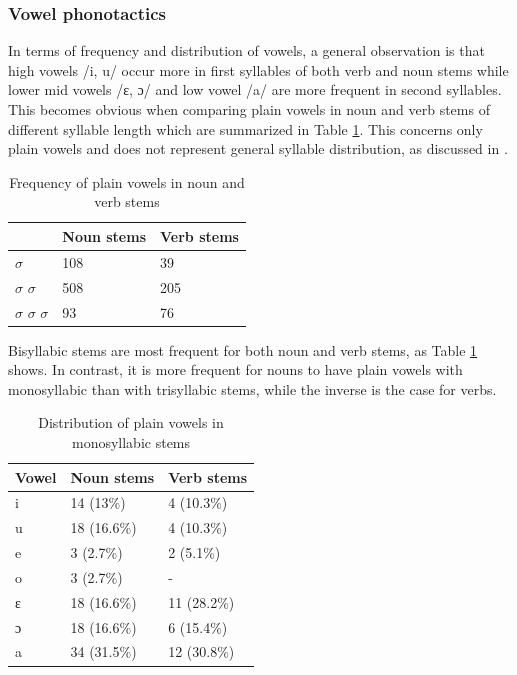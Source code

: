 \subsubsection{Vowel phonotactics} 

In terms of frequency and distribution of vowels, a general observation is that high vowels /i, u/ occur more in first syllables of both verb and noun stems while lower mid vowels /ɛ, ɔ/ and low vowel /a/ are more frequent in second syllables. This becomes obvious when comparing plain vowels in noun and verb stems of different syllable length which are summarized in Table \ref{Tab:CardV}. This concerns only plain vowels and does not represent general syllable distribution, as discussed in .


\begin{table} 
\centering
\begin{tabular}{l|ll}
& Noun stems &   Verb stems \\  \midrule
$\sigma$    & 108  &    39 \\
$\sigma$ $\sigma$  & 508 & 205 \\
$\sigma$ $\sigma$ $\sigma$ & 93 &  76 \\  \midrule
\end{tabular}
\caption{Frequency of plain vowels in noun and verb stems}
\label{Tab:CardV}
\end{table}

\noindent  Bisyllabic stems are most frequent for both noun and verb stems, as Table \ref{Tab:CardV} shows. In contrast, it is more frequent for nouns to have plain vowels with monosyllabic than with trisyllabic stems, while the inverse is the case for verbs.

\begin{table} 
\centering
\begin{tabular}{l|ll}
Vowel & Noun stems & Verb stems \\  \midrule
i &  	14 (13\%) &  4 (10.3\%) \\
u & 	18 (16.6\%) & 4 (10.3\%) \\
e & 	3 (2.7\%) &  2 (5.1\%) \\
o & 	3 (2.7\%) & - \\ 
ɛ &  	18 (16.6\%) & 11 (28.2\%) \\
ɔ & 	18 (16.6\%) & 6 (15.4\%) \\ 
a  & 	34 (31.5\%) & 12 (30.8\%) \\
\end{tabular}
\caption{Distribution of plain vowels in monosyllabic stems}
\label{Tab:MonoV}
\end{table}

